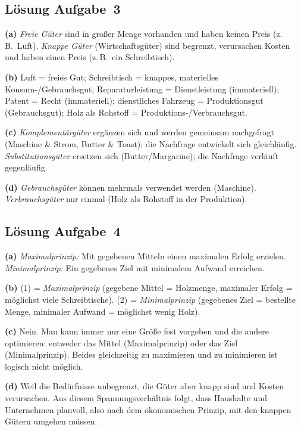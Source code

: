 \documentclass[11pt, a4paper]{article}
\begin{document}
\subsection*{Lösung Aufgabe~3}
\begin{loesung}
\textbf{(a)} \emph{Freie Güter} sind in großer Menge vorhanden und haben keinen Preis
(z.\,B.\ Luft). \emph{Knappe Güter} (Wirtschaftsgüter) sind begrenzt, verursachen Kosten
und haben einen Preis (z.\,B.\ ein Schreibtisch).

\textbf{(b)} Luft = freies Gut; Schreibtisch = knappes, materielles Konsum-/Gebrauchsgut;
Reparaturleistung = Dienstleistung (immateriell); Patent = Recht (immateriell); dienstliches
Fahrzeug = Produktionsgut (Gebrauchsgut); Holz als Rohstoff = Produktions-/Verbrauchsgut.

\textbf{(c)} \emph{Komplementärgüter} ergänzen sich und werden gemeinsam nachgefragt
(Maschine \& Strom, Butter \& Toast); die Nachfrage entwickelt sich gleichläufig.
\emph{Substitutionsgüter} ersetzen sich (Butter/Margarine); die Nachfrage verläuft
gegenläufig.

\textbf{(d)} \emph{Gebrauchsgüter} können mehrmals verwendet werden (Maschine).
\emph{Verbrauchsgüter} nur einmal (Holz als Rohstoff in der Produktion).
\end{loesung}

\subsection*{Lösung Aufgabe~4}
\begin{loesung}
\textbf{(a)} \emph{Maximalprinzip:} Mit gegebenen Mitteln einen maximalen Erfolg erzielen.
\emph{Minimalprinzip:} Ein gegebenes Ziel mit minimalem Aufwand erreichen.

\textbf{(b)} (1) = \emph{Maximalprinzip} (gegebene Mittel = Holzmenge, maximaler Erfolg =
möglichst viele Schreibtische). (2) = \emph{Minimalprinzip} (gegebenes Ziel = bestellte
Menge, minimaler Aufwand = möglichst wenig Holz).

\textbf{(c)} Nein. Man kann immer nur eine Größe fest vorgeben und die andere optimieren:
entweder das Mittel (Maximalprinzip) oder das Ziel (Minimalprinzip). Beides gleichzeitig zu
maximieren und zu minimieren ist logisch nicht möglich.

\textbf{(d)} Weil die Bedürfnisse unbegrenzt, die Güter aber knapp sind und Kosten
verursachen. Aus diesem Spannungsverhältnis folgt, dass Haushalte und Unternehmen planvoll,
also nach dem ökonomischen Prinzip, mit den knappen Gütern umgehen müssen.
\end{loesung}
\end{document}
